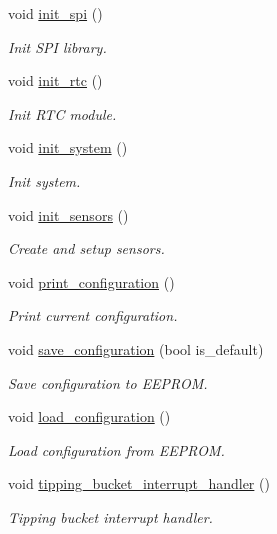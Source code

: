 \begin{DoxyCompactItemize}
void \hyperlink{i2c-rain_8ino_a8eb9780a3438ec02c70314744f91f3c7}{init\+\_\+spi} ()
\begin{DoxyCompactList}\small\item\em Init S\+PI library. \end{DoxyCompactList}\item 
void \hyperlink{i2c-rain_8ino_ab985cc69f5f573113405b4f118c96d33}{init\+\_\+rtc} ()
\begin{DoxyCompactList}\small\item\em Init R\+TC module. \end{DoxyCompactList}\item 
void \hyperlink{i2c-rain_8ino_afceb890a6ab9be73cc5481369538c705}{init\+\_\+system} ()
\begin{DoxyCompactList}\small\item\em Init system. \end{DoxyCompactList}\item 
void \hyperlink{i2c-rain_8ino_ac74850003fab6eb3269bfe043d0f939c}{init\+\_\+sensors} ()
\begin{DoxyCompactList}\small\item\em Create and setup sensors. \end{DoxyCompactList}\item 
void \hyperlink{i2c-rain_8ino_a65b2dadc0411e43874ec8ed7f73bc62a}{print\+\_\+configuration} ()
\begin{DoxyCompactList}\small\item\em Print current configuration. \end{DoxyCompactList}\item 
void \hyperlink{i2c-rain_8ino_afa979a8cb238fe81bf20654dfd6096ef}{save\+\_\+configuration} (bool is\+\_\+default)
\begin{DoxyCompactList}\small\item\em Save configuration to E\+E\+P\+R\+OM. \end{DoxyCompactList}\item 
void \hyperlink{i2c-rain_8ino_a32a64a2800c724fb28e10636f2ec20b9}{load\+\_\+configuration} ()
\begin{DoxyCompactList}\small\item\em Load configuration from E\+E\+P\+R\+OM. \end{DoxyCompactList}\item 
void \hyperlink{i2c-rain_8ino_a368e45fb147aecb0fd1478d3cc76fba7}{tipping\+\_\+bucket\+\_\+interrupt\+\_\+handler} ()
\begin{DoxyCompactList}\small\item\em Tipping bucket interrupt handler. \end{DoxyCompactList}\item 

\end{DoxyCompactItemize}
